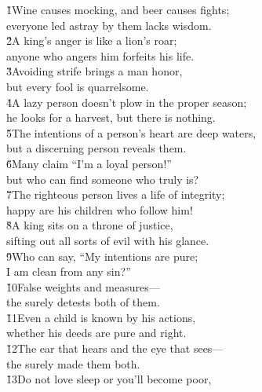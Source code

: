 \begin{poetry}
\poeml {}
\v{1}Wine causes mocking, and beer causes fights; \\
\poeml everyone led astray by them lacks wisdom. \\
\poeml \v{2}A king's anger is like a lion's roar; \\
\poemll    anyone who angers him forfeits his life. \\
\poeml \v{3}Avoiding strife brings a man honor, \\
\poemll    but every fool is quarrelsome. \\
\poeml \v{4}A lazy person doesn't plow in the proper season; \\
\poemll    he looks for a harvest, but there is nothing. \\
\poeml \v{5}The intentions of a person's heart are deep waters, \\
\poemll    but a discerning person reveals them. \\
\poeml \v{6}Many claim ``I'm a loyal person!'' \\
\poemll    but who can find someone who truly is? \\
\poeml \v{7}The righteous person lives a life of integrity; \\
\poemll    happy are his children who follow him! \\
\poeml \v{8}A king sits on a throne of justice, \\
\poemll    sifting out all sorts of evil with his glance. \\
\poeml \v{9}Who can say, ``My intentions are pure; \\
\poemll    I am clean from any sin?'' \\
\poeml \v{10}False weights and measures--- \\
\poemll    the  surely detests both of them. \\
\poeml \v{11}Even a child is known by his actions, \\
\poemll    whether his deeds are pure and right. \\
\poeml \v{12}The ear that hears and the eye that sees--- \\
\poemll    the  surely made them both. \\
\poeml \v{13}Do not love sleep or you'll become poor, \\

\end{poetry}
